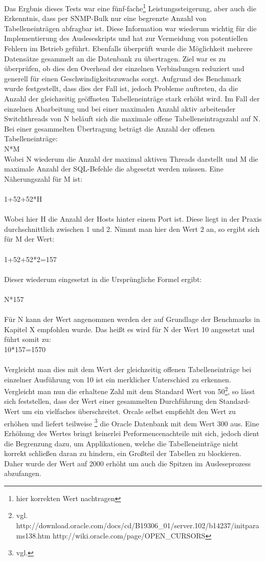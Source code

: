 Das Ergbnis dieses Tests war eine fünf-fache\footnote{hier korrekten Wert nachtragen} Leistungssteigerung, aber auch die Erkenntnis, dass per SNMP-Bulk nur eine begrenzte Anzahl von Tabelleneinträgen abfragbar ist. Diese Information war wiederum wichtig für die Implementierung des Ausleseskripts und hat zur Vermeidung von potentiellen Fehlern im Betrieb geführt. Ebenfalls überprüft wurde die Möglichkeit mehrere Datensätze gesammelt an die Datenbank zu übertragen. Ziel war es zu überprüfen, ob dies den Overhead der einzelnen Verbindungen reduziert und generell für einen Geschwindigkeitszuwachs sorgt. Aufgrund des Benchmark wurde festgestellt, dass dies der Fall ist, jedoch Probleme auftreten, da die Anzahl der gleichzeitig geöffneten Tabelleneinträge stark erhöht wird. Im Fall der einzelnen Abarbeitung und bei einer maximalen Anzahl aktiv arbeitender Switchthreads von N beläuft sich die maximale offene Tabelleneintragszahl auf N.
\\ Bei einer gesammelten Übertragung beträgt die Anzahl der offenen Tabelleneinträge:\\
N*M\\
Wobei N wiederum die Anzahl der maximal aktiven Threads darstellt und M die maximale Anzahl der SQL-Befehle die abgesetzt werden müssen. Eine Näherungszahl für M ist:\\
\\
1+52+52*H\\
\\
Wobei hier H die Anzahl der Hosts hinter einem Port ist. Diese liegt in der Praxis durchschnittlich zwischen 1 und 2. Nimmt man hier den Wert 2 an, so ergibt sich für M der Wert:\\
\\
1+52+52*2=157\\
\\
Dieser wiederum eingesetzt in die Ursprüngliche Formel ergibt:\\
\\
N*157\\
\\
Für N kann der Wert angenommen werden der auf Grundlage der Benchmarks in Kapitel X empfohlen wurde. Das heißt es wird für N der Wert 10 angesetzt und führt somit zu:
\\
10*157=1570\\
\\
Vergleicht man dies mit dem Wert der gleichzeitig offenen Tabelleneinträge bei einzelner Ausführung von 10 ist ein merklicher Unterschied zu erkennen. Vergleicht man nun die erhaltene Zahl mit dem Standard Wert von 50\footnote{vgl. http://download.oracle.com/docs/cd/B19306\_01/server.102/b14237/initparams138.htm  http://wiki.oracle.com/page/OPEN\_CURSORS}, so lässt sich feststellen, dass der Wert einer gesammelten Durchführung den Standard-Wert um ein vielfaches überschreitet. Orcale selbst empfiehlt den Wert zu erhöhen und liefert teilweise \footnote{vgl.} die Oracle Datenbank mit dem Wert 300 aus. Eine Erhöhung des Wertes bringt keinerlei Performencenachteile mit sich, jedoch dient die Begrenzung dazu, um Applikationen, welche die Tabelleneinträge nicht korrekt schließen daran zu hindern, ein Großteil der Tabellen zu blockieren. Daher wurde der Wert auf 2000 erhöht um auch die Spitzen im Ausleseprozess abzufangen.\\
